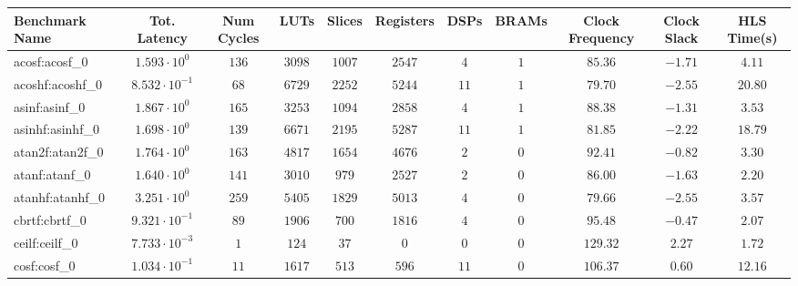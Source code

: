\begin{tabular}{|l|c|c|c|c|c|c|c|c|c|c|}
\hline
Benchmark Name               & Tot. Latency            & Num Cycles & LUTs       & Slices    & Registers & DSPs    & BRAMs & Clock Frequency & Clock Slack & HLS Time(s) \\
\hline
acosf:acosf\_0               & $ 1.593 \cdot 10^{0}  $ & $ 136    $ & $ 3098   $ & $ 1007  $ & $ 2547  $ & $ 4   $ & $ 1 $ & $ 85.36       $ & $ -1.71   $ & $ 4.11    $ \\
acoshf:acoshf\_0             & $ 8.532 \cdot 10^{-1} $ & $ 68     $ & $ 6729   $ & $ 2252  $ & $ 5244  $ & $ 11  $ & $ 1 $ & $ 79.70       $ & $ -2.55   $ & $ 20.80   $ \\
asinf:asinf\_0               & $ 1.867 \cdot 10^{0}  $ & $ 165    $ & $ 3253   $ & $ 1094  $ & $ 2858  $ & $ 4   $ & $ 1 $ & $ 88.38       $ & $ -1.31   $ & $ 3.53    $ \\
asinhf:asinhf\_0             & $ 1.698 \cdot 10^{0}  $ & $ 139    $ & $ 6671   $ & $ 2195  $ & $ 5287  $ & $ 11  $ & $ 1 $ & $ 81.85       $ & $ -2.22   $ & $ 18.79   $ \\
atan2f:atan2f\_0             & $ 1.764 \cdot 10^{0}  $ & $ 163    $ & $ 4817   $ & $ 1654  $ & $ 4676  $ & $ 2   $ & $ 0 $ & $ 92.41       $ & $ -0.82   $ & $ 3.30    $ \\
atanf:atanf\_0               & $ 1.640 \cdot 10^{0}  $ & $ 141    $ & $ 3010   $ & $ 979   $ & $ 2527  $ & $ 2   $ & $ 0 $ & $ 86.00       $ & $ -1.63   $ & $ 2.20    $ \\
atanhf:atanhf\_0             & $ 3.251 \cdot 10^{0}  $ & $ 259    $ & $ 5405   $ & $ 1829  $ & $ 5013  $ & $ 4   $ & $ 0 $ & $ 79.66       $ & $ -2.55   $ & $ 3.57    $ \\
cbrtf:cbrtf\_0               & $ 9.321 \cdot 10^{-1} $ & $ 89     $ & $ 1906   $ & $ 700   $ & $ 1816  $ & $ 4   $ & $ 0 $ & $ 95.48       $ & $ -0.47   $ & $ 2.07    $ \\
ceilf:ceilf\_0               & $ 7.733 \cdot 10^{-3} $ & $ 1      $ & $ 124    $ & $ 37    $ & $ 0     $ & $ 0   $ & $ 0 $ & $ 129.32      $ & $ 2.27    $ & $ 1.72    $ \\
cosf:cosf\_0                 & $ 1.034 \cdot 10^{-1} $ & $ 11     $ & $ 1617   $ & $ 513   $ & $ 596   $ & $ 11  $ & $ 0 $ & $ 106.37      $ & $ 0.60    $ & $ 12.16   $ \\

\end{tabular}
